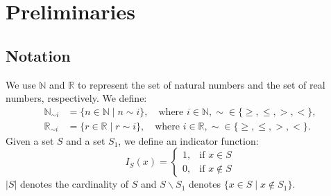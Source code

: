 \section{Preliminaries}
\subsection{Notation}
\label{notation123}
We use \(\mathbb{N}\) and \(\mathbb{R}\) to represent the set of natural numbers and the set of real numbers, respectively. We define:
\begin{align*}
  \mathbb{N}_{\sim i} &= \{n \in \mathbb{N} \mid n \sim i\}, \quad \text{where } i \in \mathbb{N}, \sim \in \{\geq, \leq, >, <\}, \\
  \mathbb{R}_{\sim i} &= \{r \in \mathbb{R} \mid r \sim i\}, \quad \text{where } i \in \mathbb{R}, \sim \in \{\geq, \leq, >, <\}.
\end{align*}
Given a set \( S \) and a set $S_1$, we define an indicator function:
$$I_S(x) =
  \begin{cases}
  1, & \text{if } x \in S \\
  0, & \text{if } x \not\in S
  \end{cases}$$
$|S|$ denotes the cardinality of $S$ and $S\backslash S_1$ denotes $\{x \in S \mid x \not\in S_1\}$.


